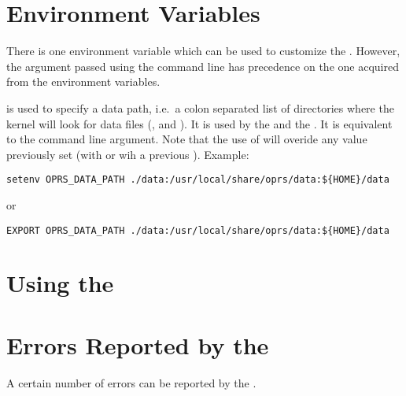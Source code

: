 \section{\OPC{} Environment Variables}

There is one environment variable which can be used to customize the \OPC{}.
However, the argument passed using the command line has precedence on the one
acquired from the environment variables.

\begin{description}


\item[\code{OPRS\_DATA\_PATH}] is used  to specify a data path, i.e.\ a colon separated
list of directories where the kernel will look for data files (,
 and ). It is used by the \CPK{} and the \XPK{}. It is
equivalent to the  command line argument. Note that the use of
 will overide any value previously set (with  
or wih a previous ).\*
Example:
\begin{verbatim}
setenv OPRS_DATA_PATH ./data:/usr/local/share/oprs/data:${HOME}/data
\end{verbatim}
or
\begin{verbatim}
EXPORT OPRS_DATA_PATH ./data:/usr/local/share/oprs/data:${HOME}/data
\end{verbatim}

\end{description}

\section{Using the \OPC{}}

\section{Errors Reported by the \OPC{}}

A certain number of errors can be reported by the \OPC{}.

